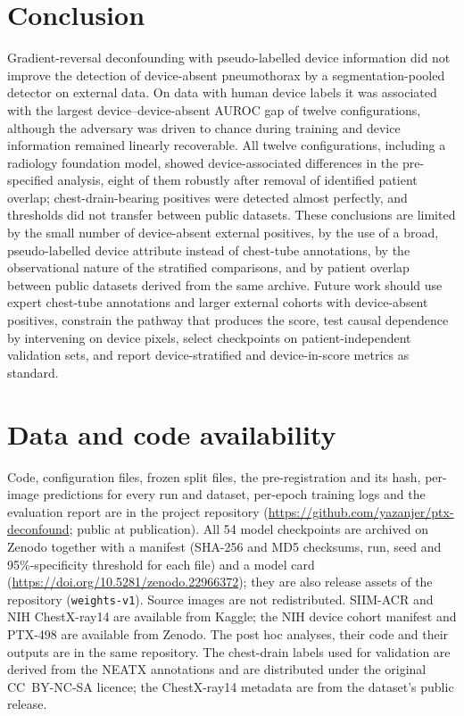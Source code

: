 \documentclass{ieeeaccess}
\begin{document}
\section{Conclusion}
\label{sec:conclusion}
Gradient-reversal deconfounding with pseudo-labelled device information did not improve the detection of device-absent pneumothorax by a segmentation-pooled detector on external data. On data with human device labels it was associated with the largest device--device-absent AUROC gap of twelve configurations, although the adversary was driven to chance during training and device information remained linearly recoverable. All twelve configurations, including a radiology foundation model, showed device-associated differences in the pre-specified analysis, eight of them robustly after removal of identified patient overlap; chest-drain-bearing positives were detected almost perfectly, and thresholds did not transfer between public datasets. These conclusions are limited by the small number of device-absent external positives, by the use of a broad, pseudo-labelled device attribute instead of chest-tube annotations, by the observational nature of the stratified comparisons, and by patient overlap between public datasets derived from the same archive. Future work should use expert chest-tube annotations and larger external cohorts with device-absent positives, constrain the pathway that produces the score, test causal dependence by intervening on device pixels, select checkpoints on patient-independent validation sets, and report device-stratified and device-in-score metrics as standard.

\section*{Data and code availability}
Code, configuration files, frozen split files, the pre-registration and its hash, per-image predictions for every run and dataset, per-epoch training logs and the evaluation report are in the project repository (\url{https://github.com/yazanjer/ptx-deconfound}; public at publication). All 54 model checkpoints are archived on Zenodo together with a manifest (SHA-256 and MD5 checksums, run, seed and 95\%-specificity threshold for each file) and a model card (\url{https://doi.org/10.5281/zenodo.22966372}); they are also release assets of the repository (\texttt{weights-v1}). Source images are not redistributed. SIIM-ACR and NIH ChestX-ray14 are available from Kaggle; the NIH device cohort manifest \cite{zamora2026cohort} and PTX-498 \cite{wang2021ptx498} are available from Zenodo. The post hoc analyses, their code and their outputs are in the same repository. The chest-drain labels used for validation are derived from the NEATX annotations \cite{jimenez2023shortcuts} and are distributed under the original CC~BY-NC-SA licence; the ChestX-ray14 metadata are from the dataset's public release.
\end{document}
